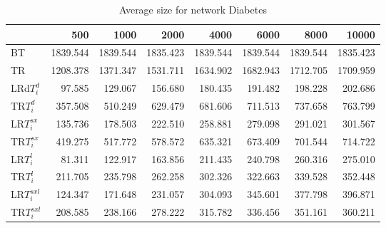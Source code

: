 \begin{table}
\begin{center}
\begin{tabular}{lrrrrrrr}
 & 500 &  1000 & 2000 & 4000 & 6000& 8000&  10000\\\hline
BT & 1839.544 & 1839.544 & 1835.423 & 1839.544 & 1839.544 & 1839.544 & 1835.423\\\hline
TR & 1208.378 & 1371.347 & 1531.711 & 1634.902 & 1682.943 & 1712.705 & 1709.959\\\hline
LRd$T_i^d$ & 97.585 & 129.067 & 156.680 & 180.435 & 191.482 & 198.228 & 202.686\\\hline
TR$T_i^d$ & 357.508 & 510.249 & 629.479 & 681.606 & 711.513 & 737.658 & 763.799\\\hline
LR$T_i^{sx}$ & 135.736 & 178.503 & 222.510 & 258.881 & 279.098 & 291.021 & 301.567\\\hline
TR$T_i^{sx}$ & 419.275 & 517.772 & 578.572 & 635.321 & 673.409 & 701.544 & 714.722\\\hline
LR$T_i^l$ & 81.311 & 122.917 & 163.856 & 211.435 & 240.798 & 260.316 & 275.010\\\hline
TR$T_i^l$ & 211.705 & 235.798 & 262.258 & 302.326 & 322.663 & 339.528 & 352.448\\\hline
LR$T_i^{sxl}$ & 124.347 & 171.648 & 231.057 & 304.093 & 345.601 & 377.798 & 396.871\\\hline
TR$T_i^{sxl}$ & 208.585 & 238.166 & 278.222 & 315.782 & 336.456 & 351.161 & 360.211\\\hline
\end{tabular}
\end{center}
\caption{Average size for network Diabetes }
\label{Diabetessi}
\end{table}

